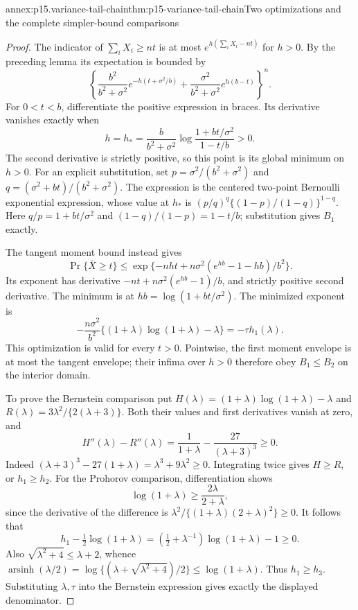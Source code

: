 \begin{annexitem}{annex:p15.variance-tail-chain}{thm:p15-variance-tail-chain}{Two optimizations and the complete simpler-bound comparisons}
\begin{proof}
The indicator of \(\sum_iX_i\geq nt\) is at most
\(e^{h(\sum_iX_i-nt)}\) for \(h>0\).
By the preceding lemma its expectation is bounded by
\[
 \left\{
 \frac{b^2}{b^2+\sigma^2}e^{-h(t+\sigma^2/b)}
 +\frac{\sigma^2}{b^2+\sigma^2}e^{h(b-t)}
 \right\}^{n}.
\]
For \(0<t<b\), differentiate the positive expression in braces.
Its derivative vanishes exactly when
\[
 h=h_*=\frac{b}{b^2+\sigma^2}
       \log\frac{1+bt/\sigma^2}{1-t/b}>0 .
\]
The second derivative is strictly positive, so this point is its
global minimum on \(h>0\).
For an explicit substitution, set
\(p=\sigma^2/(b^2+\sigma^2)\) and
\(q=(\sigma^2+bt)/(b^2+\sigma^2)\). The expression is the centered
two-point Bernoulli exponential expression, whose value at \(h_*\) is
\((p/q)^q\{(1-p)/(1-q)\}^{1-q}\).
Here \(q/p=1+bt/\sigma^2\) and
\((1-q)/(1-p)=1-t/b\); substitution gives \(B_1\) exactly.

The tangent moment bound instead gives
\[
 \Pr\{\overline X\geq t\}
 \leq \exp\{-nht+n\sigma^2(e^{hb}-1-hb)/b^2\}.
\]
Its exponent has derivative
\(-nt+n\sigma^2(e^{hb}-1)/b\), and strictly positive second derivative.
The minimum is at \(hb=\log(1+bt/\sigma^2)\).
The minimized exponent is
\[
 -\frac{n\sigma^2}{b^2}
       \{(1+\lambda)\log(1+\lambda)-\lambda\}
 =-\tau h_1(\lambda).
\]
This optimization is valid for every \(t>0\).
Pointwise, the first moment envelope is at most the tangent envelope;
their infima over \(h>0\) therefore obey \(B_1\leq B_2\) on the
interior domain.

To prove the Bernstein comparison put
\(H(\lambda)=(1+\lambda)\log(1+\lambda)-\lambda\) and
\(R(\lambda)=3\lambda^2/\{2(\lambda+3)\}\).
Both their values and first derivatives vanish at zero, and
\[
 H''(\lambda)-R''(\lambda)
 =\frac1{1+\lambda}-\frac{27}{(\lambda+3)^3}\geq0.
\]
Indeed \((\lambda+3)^3-27(1+\lambda)=\lambda^3+9\lambda^2\geq0\).
Integrating twice gives \(H\geq R\), or \(h_1\geq h_2\).
For the Prohorov comparison, differentiation shows
\[
 \log(1+\lambda)\geq\frac{2\lambda}{2+\lambda},
\]
since the derivative of the difference is
\(\lambda^2/\{(1+\lambda)(2+\lambda)^2\}\geq0\).
It follows that
\[
 h_1-\tfrac12\log(1+\lambda)
 =(\tfrac12+\lambda^{-1})\log(1+\lambda)-1\geq0.
\]
Also \(\sqrt{\lambda^2+4}\leq\lambda+2\), whence
\(\operatorname{arsinh}(\lambda/2)
 =\log\{(\lambda+\sqrt{\lambda^2+4})/2\}\leq\log(1+\lambda)\).
Thus \(h_1\geq h_3\). Substituting \(\lambda,\tau\) into the
Bernstein expression gives exactly the displayed denominator.


\end{proof}
\end{annexitem}
